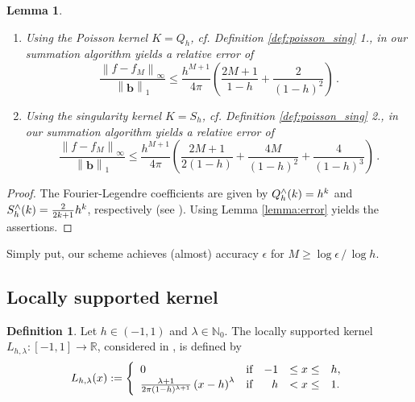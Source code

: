 \documentclass[11pt,a4paper,twoside,bibtotoc]{scrartcl}
\theoremstyle{plain}
\newtheorem{lemma}[theorem]{Lemma}
\theoremstyle{definition}
\newtheorem{definition}[theorem]{Definition}
\theoremstyle{remark}
\newcommand{\NZ}{\ensuremath{\mathbb{N}_{0}}}
\newcommand{\R}{\ensuremath{\mathbb{R}}}
\newcommand{\fun}[2]{\ensuremath{#1{\hspace{-0.4ex}}\left(#2\right)}}
\numberwithin{equation}{section}
\numberwithin{table}{section}
\numberwithin{figure}{section}
\begin{document}
\begin{lemma}
  ${}^{}$\\[-2ex]
 \begin{enumerate}
   \item 
Using the Poisson kernel $K=Q_h$, cf. Definition \ref{def:poisson_sing} 1.,
in our summation algorithm yields a relative error of
     \begin{equation}
       \label{error:poisson}
       \frac{\left\|f - f_{M}\right\|_{\infty}}{\left\|\mathbf{b}\right\|_1} \le
       \frac{h^{M+1}}{4\pi}
       \left(\frac{2M+1}{1-h}+\frac{2}{\left(1-h\right)^2}\right)\, .
     \end{equation}
     \item 
Using the singularity kernel $K=S_h$, cf. Definition \ref{def:poisson_sing}
2., in our summation algorithm yields a relative error of 
       \begin{equation}
         \label{error:singular}
         \frac{\left\|f - f_{M}\right\|_{\infty}}{\left\|\mathbf{b}\right\|_1} \le
         \frac{h^{M+1}}{4\pi} \left(\frac{2M+1}{2\left(1-h\right)}+
           \frac{4M}{\left(1-h\right)^2}+
         \frac{4}{\left(1-h\right)^3}\right)\, .
       \end{equation}
 \end{enumerate}
\end{lemma}
\begin{proof}
The Fourier-Legendre coefficients are given by $\fun{Q_{h}^{\wedge}}{k}=h^k$ and
$\fun{S_{h}^{\wedge}}{k}=\frac{2}{2k+1}h^k$, respectively (see \cite[pp. 107]{frgesc}).
Using Lemma \ref{lemma:error} yields the assertions.
\end{proof}
  
Simply put, our scheme achieves (almost) accuracy $\epsilon$ for $M \ge \log\epsilon \,
/ \, \log h$.

\subsection{Locally supported kernel}
\begin{definition}
  Let $h \in (-1,1)$ and $\lambda \in \NZ$.
  The locally supported kernel
    $L_{h,\lambda}:[-1,1] \rightarrow \R$, considered in
    \cite{Sc97}, is defined by
    \[
    \fun{L_{h,\lambda}}{x} := 
    \left\{\begin{array}{l@{\quad \text{if} \quad}rcl} 
        0 & -1 &\le x \le& h, \\
        \frac{\lambda+1}{2\pi(1-h)^{\lambda+1}}\left(x-h\right)^{\lambda} &  h & <  x \le& 1.
      \end{array}\right.
    \]
\end{definition}
\end{document}
